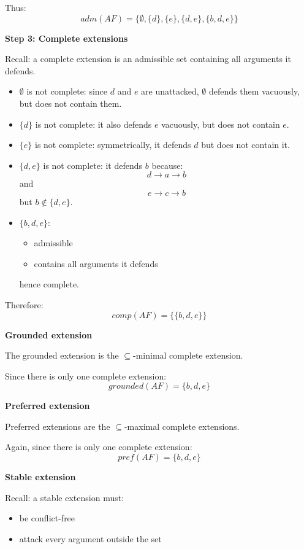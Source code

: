 \documentclass[11pt]{article}
\begin{document}
Thus:
\[
\textit{adm}(AF)=
\{
\emptyset,
\{d\},
\{e\},
\{d,e\},
\{b,d,e\}
\}
\]

\textbf{Step 3: Complete extensions}

Recall: a complete extension is an admissible set containing all arguments it defends.

\begin{itemize}
    \item $\emptyset$ is not complete:
    since $d$ and $e$ are unattacked, $\emptyset$ defends them vacuously,
    but does not contain them.

    \item $\{d\}$ is not complete:
    it also defends $e$ vacuously, but does not contain $e$.

    \item $\{e\}$ is not complete:
    symmetrically, it defends $d$ but does not contain it.

    \item $\{d,e\}$ is not complete:
    it defends $b$ because:
    \[
    d \to a \to b
    \]
    and
    \[
    e \to c \to b
    \]
    but $b \notin \{d,e\}$.

    \item $\{b,d,e\}$:
    \begin{itemize}
        \item admissible
        \item contains all arguments it defends
    \end{itemize}
    hence complete.
\end{itemize}

Therefore:
\[
\textit{comp}(AF)=
\{
\{b,d,e\}
\}
\]

\textbf{Grounded extension}

The grounded extension is the $\subseteq$-minimal complete extension.

Since there is only one complete extension:
\[
\boxed{
\textit{grounded}(AF)=\{b,d,e\}
}
\]

\textbf{Preferred extension}

Preferred extensions are the $\subseteq$-maximal complete extensions.

Again, since there is only one complete extension:
\[
\boxed{
\textit{pref}(AF)=\{b,d,e\}
}
\]

\textbf{Stable extension}

Recall: a stable extension must:
\begin{itemize}
    \item be conflict-free
    \item attack every argument outside the set
\end{itemize}
\end{document}
